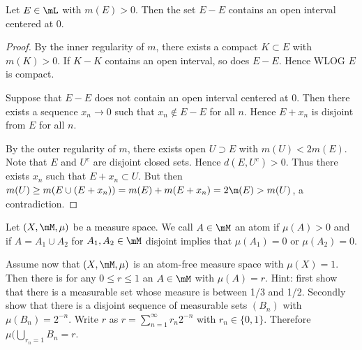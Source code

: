 \documentclass{article}
\begin{document}
 Let $E \in \mL$ with $m(E) > 0$. Then the set $E - E$ contains an open interval centered at 0.
\begin{proof}
By the inner regularity of $m$, there exists a compact $K \subset E$ with $m(K) > 0$. If $K - K$ contains an open interval, so does $E - E$. Hence WLOG $E$ is compact.

Suppose that $E - E$ does not contain an open interval centered at 0. Then there exists a sequence $x_n \to 0$ such that $x_n \not\in E - E$ for all $n$.  Hence $E + x_n$ is disjoint from $E$ for all $n$.

By the outer regularity of $m$, there exists open $U \supset E$ with $m(U) < 2 m(E)$.  Note that $E$ and $U^c$ are disjoint closed sets. Hence $d(E, U^c) > 0$.  Thus there exists $x_n$ such that $E + x_n \subset U$.  But then $m(U) \ge m(E \cup (E + x_n)) = m(E) + m(E + x_n) = 2 \m(E) > m(U)$, a contradiction.
\end{proof}

 Let $(X , \mM, \mu)$ be a measure space. We call $A \in \mM$ an atom if $\mu(A) > 0$ and if $A = A_1 \cup A_2$ for $A_1, A_2 \in \mM$ disjoint implies that $\mu(A_1) = 0$ or $\mu(A_2) = 0$.

Assume now that $(X, \mM, \mu)$ is an atom-free measure space with $\mu(X) = 1$. Then there is for any $0 \le r \le 1$ an $A \in \mM$ with $\mu(A) = r$. Hint: first show that there is a measurable set whose measure is between 1/3 and 1/2. Secondly show that there is a disjoint sequence of measurable sets $(B_n)$ with $\mu(B_n) = 2^{-n}$. Write $r$ as $r = \sum_{n=1}^\infty r_n2^{-n}$ with $r_n \in \{0, 1\}$.  Therefore $\mu(\bigcup_{r_n=1} B_n = r$.
\end{document}
